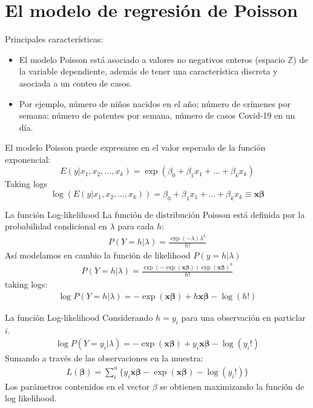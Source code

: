 \section[Poisson]{El modelo de regresión de Poisson}
\begin{frame}
	Principales caracter\'{i}sticas:
		\begin{itemize}
			\item El modelo Poisson está asociado a valores no negativos enteros (espacio $\mathbb{Z}$) de la variable dependiente, además de tener  una característica discreta y asociada a un conteo de casos.
			\item Por ejemplo, número de niños nacidos en el año; número de crímenes por semana; número de patentes por semana, número de casos Covid-19 en un día. 
		\end{itemize}
	El modelo Poisson puede expresarse en el valor esperado de la función exponencial:
		\begin{equation}\label{eqn:poiss}
			E(y|x_1,x_2, \dots, x_k)=\exp(\beta_0+\beta_1x_1+\dots+\beta_kx_k)
		\end{equation}
	Taking logs
		\begin{equation}
			\log (E(y|x_1,x_2, \dots, x_k))=\beta_0+\beta_1x_1+\dots+\beta_kx_k \equiv \boldsymbol{x\beta}
		\end{equation}
\end{frame}
\begin{frame}{La función Log-likelihood}
	La función de distribución Poisson está definida por la probabilidad condicional en $\lambda$ para cada $h$:
		\begin{align*}
			P(Y=h | \lambda)=\frac{\exp(-\lambda)\lambda^h}{h!}
		\end{align*}
	Así modelamos en cambio la función de likelihood $P(y=h | \lambda)$
		\begin{align*}
			P(Y=h | \lambda)=\frac{\exp(-\exp(\boldsymbol{x\beta}))\exp(\boldsymbol{x\beta})^h}{h!}
		\end{align*}
	taking logs:
		\begin{align*}
			\log P(Y=h | \lambda)=-\exp(\boldsymbol{x\beta})+h \boldsymbol{x\beta}-\log (h!)
		\end{align*}
\end{frame}
\begin{frame}{La función Log-likelihood}
	Considerando $h=y_i$ para una observación en particlar $i$.
		\begin{align*}
			\log P(Y=y_i | \lambda)=-\exp(\boldsymbol{x\beta})+y_i \boldsymbol{x\beta}-\log (y_i!)
		\end{align*}
	Sumando a través de las observaciones en la muestra:
		\begin{align*}
			L( \boldsymbol{\beta})=\sum_{i}^n\{y_i \boldsymbol{x\beta} - \exp(\boldsymbol{x\beta}) -\log (y_i!)\}
		\end{align*}
	Los parámetros contenidos en el vector $\beta$ se obtienen maximizando la función de log likelihood.
\end{frame}
